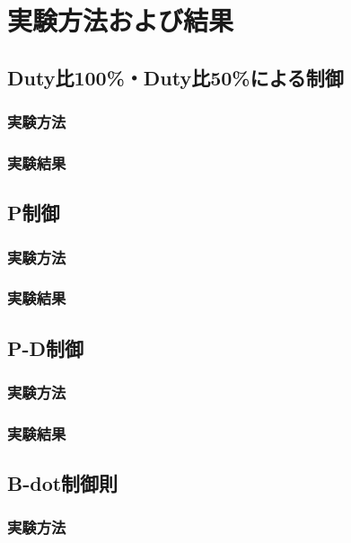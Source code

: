 \section{実験方法および結果}
\subsection{Duty比100\%・Duty比50\%による制御}
\subsubsection{実験方法}
\subsubsection{実験結果}


\newpage

\subsection{P制御}
\subsubsection{実験方法}
\subsubsection{実験結果}

\newpage

\subsection{P-D制御}
\subsubsection{実験方法}
\subsubsection{実験結果}

\newpage

\subsection{B-dot制御則}
\subsubsection{実験方法}
